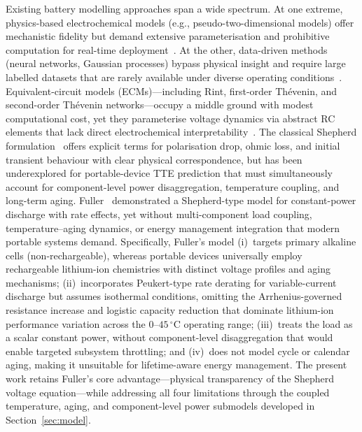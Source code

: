 \documentclass[5p,times,number]{elsarticle}
\newcommand{\secref}[1]{\hyperref[#1]{\textup{Section~\ref*{#1}}}}
\def\secref#1{Section~\ref{#1}}
\begin{document}
Existing battery modelling approaches span a wide spectrum.
At one extreme, physics-based electrochemical models (e.g., pseudo-two-dimensional models) offer mechanistic fidelity but demand extensive parameterisation and prohibitive computation for real-time deployment~\cite{Doyle1993,Newman2004,Mama2025}.
At the other, data-driven methods (neural networks, Gaussian processes) bypass physical insight and require large labelled datasets that are rarely available under diverse operating conditions~\cite{Chemali2018,Richardson2017,Xu2012ECM}.
Equivalent-circuit models (ECMs)---including Rint, first-order Th\'{e}venin, and second-order Th\'{e}venin networks---occupy a middle ground with modest computational cost, yet they parameterise voltage dynamics via abstract RC elements that lack direct electrochemical interpretability~\cite{Hu2012,You2018,He2012ECM}.
The classical Shepherd formulation~\cite{Shepherd1965} offers explicit terms for polarisation drop, ohmic loss, and initial transient behaviour with clear physical correspondence, but has been underexplored for portable-device TTE prediction that must simultaneously account for component-level power disaggregation, temperature coupling, and long-term aging.
Fuller~\cite{Fuller2014} demonstrated a Shepherd-type model for constant-power discharge with rate effects, yet without multi-component load coupling, temperature--aging dynamics, or energy management integration that modern portable systems demand.
Specifically, Fuller's model (i)~targets primary alkaline cells (non-rechargeable), whereas portable devices universally employ rechargeable lithium-ion chemistries with distinct voltage profiles and aging mechanisms; (ii)~incorporates Peukert-type rate derating for variable-current discharge but assumes isothermal conditions, omitting the Arrhenius-governed resistance increase and logistic capacity reduction that dominate lithium-ion performance variation across the $0$--$45\,^{\circ}$C operating range; (iii)~treats the load as a scalar constant power, without component-level disaggregation that would enable targeted subsystem throttling; and (iv)~does not model cycle or calendar aging, making it unsuitable for lifetime-aware energy management.
The present work retains Fuller's core advantage---physical transparency of the Shepherd voltage equation---while addressing all four limitations through the coupled temperature, aging, and component-level power submodels developed in \secref{sec:model}.
\end{document}
